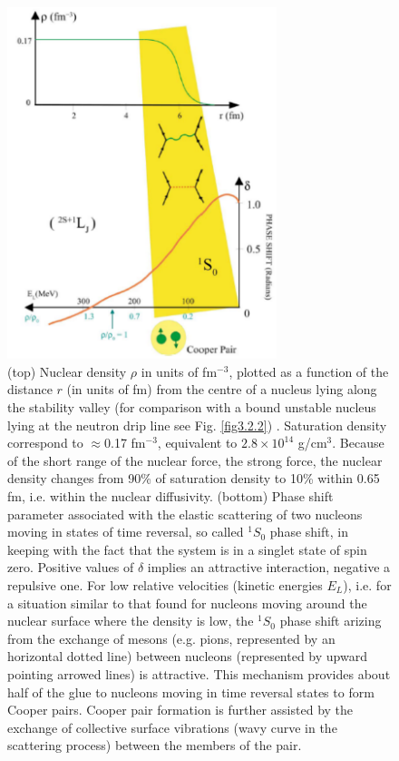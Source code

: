   \begin{figure}
  \centerline{\includegraphics*[width=0.7\textwidth,angle=0]{nutshell/figs/fig1F1.pdf}}\caption{(top) Nuclear density $\rho$ in units of fm$^{-3}$, plotted as a function of the distance $r$ (in units of fm) from
    the centre of a nucleus lying along the stability valley (for comparison with a bound unstable nucleus lying at the neutron drip line see Fig. \ref{fig3.2.2}) . Saturation density correspond to $\approx$0.17 fm$^{-3}$, equivalent to $2.8\times 10^{14}$ g/cm$^3$. Because of the short range of
    the nuclear force, the strong force, the nuclear density changes from 90\% of saturation density to 10\% within 0.65 fm, i.e. within the
    nuclear diffusivity. (bottom) Phase shift  parameter associated with the elastic scattering of two nucleons moving in states of time reversal, so
    called $^1S_0$ phase shift, in keeping with the fact that the system is in a singlet state of spin zero. Positive values of $\delta$ implies an attractive interaction, negative a repulsive one. For low relative velocities
    (kinetic energies $E_L$), i.e. for a situation similar to that found for nucleons moving around the nuclear surface where the density is low, the $^1S_0$ phase shift arizing from the exchange of mesons (e.g. pions, represented by an horizontal dotted  line) between nucleons (represented by upward pointing arrowed lines)
    is attractive. This mechanism provides about half of the glue to nucleons moving in time reversal states to form Cooper pairs. Cooper pair formation is
    further assisted by the exchange of collective surface vibrations (wavy curve in the scattering process) between the members of the
    pair.}\label{fig1F1}
  \end{figure}
